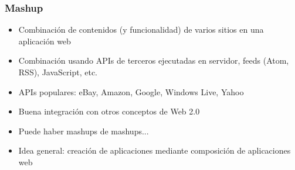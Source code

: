 
\begin{frame}
\frametitle{Mashup}

\begin{itemize}
\item Combinación de contenidos (y funcionalidad) de varios sitios en
  una aplicación web
\item Combinación usando APIs de terceros ejecutadas en servidor,
  feeds (Atom, RSS), JavaScript, etc.
\item APIs populares: eBay, Amazon, Google, Windows Live, Yahoo
\item Buena integración con otros conceptos de Web 2.0
\item Puede haber mashups de mashups...
\item Idea general: creación de aplicaciones mediante composición de
  aplicaciones web
\end{itemize}

\end{frame}






